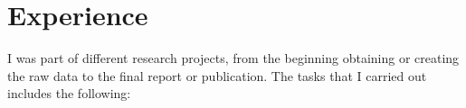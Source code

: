 \documentclass[11pt,a4paper,]{awesome-cv}
\begin{document}
\makecvheader






\hypertarget{experience}{%
\section{Experience}\label{experience}}

\begin{cventries}
    \vspace{-4.0mm}
\end{cventries}

I was part of different research projects, from the beginning obtaining
or creating the raw data to the final report or publication. The tasks
that I carried out includes the following:
\end{document}
